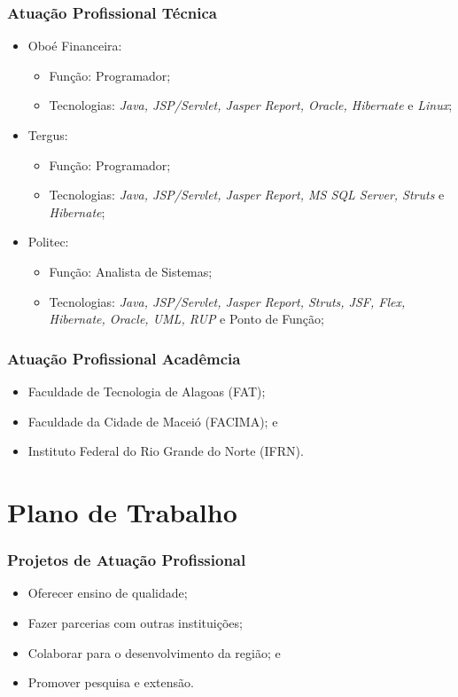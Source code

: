 \documentclass[aspectratio=169]{beamer}
\begin{document}
\begin{frame}
	\frametitle{Atuação Profissional Técnica}
		
	\begin{itemize}
		\item Oboé Financeira:
		\begin{itemize}
			\item Função: Programador;
			\item Tecnologias: \textit{Java, JSP/Servlet, Jasper Report, Oracle, Hibernate} e \textit{Linux};
		\end{itemize}
		
		\item Tergus:
		\begin{itemize}
			\item Função: Programador;
			\item Tecnologias: \textit{Java, JSP/Servlet, Jasper Report, MS SQL Server, Struts} e \textit{Hibernate};
		\end{itemize}
		
		\item Politec:
		\begin{itemize}
			\item Função: Analista de Sistemas;
			\item Tecnologias: \textit{Java, JSP/Servlet, Jasper Report, Struts, JSF, Flex, Hibernate, Oracle, UML, RUP} e Ponto de Função;
		\end{itemize}
	\end{itemize}
\end{frame}

\begin{frame}
	\frametitle{Atuação Profissional Acadêmcia}

	\begin{itemize}
		\item Faculdade de Tecnologia de Alagoas (FAT);
		\item Faculdade da Cidade de Maceió (FACIMA); e
		\item Instituto Federal do Rio Grande do Norte (IFRN).
	\end{itemize}
\end{frame}

\section{Plano de Trabalho}

\begin{frame}
	\frametitle{Projetos de Atuação Profissional}
	
	\begin{itemize}
		\item Oferecer ensino de qualidade;
		\item Fazer parcerias com outras instituições;
		\item Colaborar para o desenvolvimento da região; e
		\item Promover pesquisa e extensão.
	\end{itemize}
\end{frame}
\end{document}
